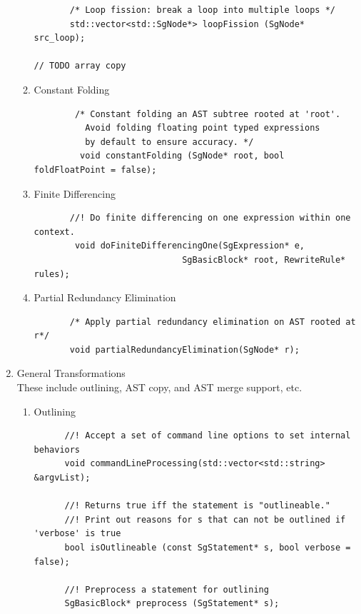 \begin{enumerate}
\begin{enumerate}
\begin{lstlisting}
       /* Loop fission: break a loop into multiple loops */
       std::vector<std::SgNode*> loopFission (SgNode* src_loop);

// TODO array copy 
       \end{lstlisting}
      \item Constant Folding
       \begin{lstlisting}
        /* Constant folding an AST subtree rooted at 'root'. 
          Avoid folding floating point typed expressions 
          by default to ensure accuracy. */
         void constantFolding (SgNode* root, bool foldFloatPoint = false);

       \end{lstlisting}
      \item Finite Differencing  
       \begin{lstlisting}
       //! Do finite differencing on one expression within one context.
        void doFiniteDifferencingOne(SgExpression* e,
                             SgBasicBlock* root, RewriteRule* rules);
       \end{lstlisting}

      \item Partial Redundancy Elimination
       \begin{lstlisting}
       /* Apply partial redundancy elimination on AST rooted at r*/
       void partialRedundancyElimination(SgNode* r);
       \end{lstlisting}

   \end{enumerate} %

   \item General Transformations \\
         These include outlining, AST copy, and AST merge support, etc.
   \begin{enumerate}
      \item Outlining  
      \begin{lstlisting}
      //! Accept a set of command line options to set internal behaviors
      void commandLineProcessing(std::vector<std::string> &argvList);

      //! Returns true iff the statement is "outlineable."
      //! Print out reasons for s that can not be outlined if 'verbose' is true
      bool isOutlineable (const SgStatement* s, bool verbose = false);

      //! Preprocess a statement for outlining
      SgBasicBlock* preprocess (SgStatement* s);


\end{lstlisting}
\end{enumerate}
\end{enumerate}
